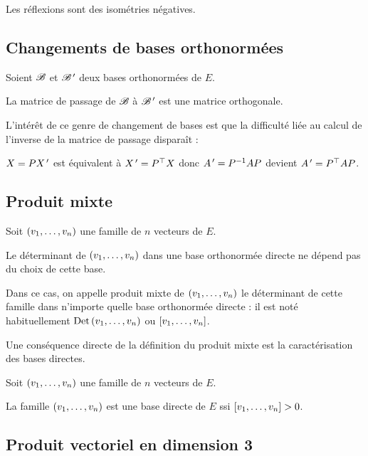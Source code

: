 Les réflexions sont des isométries négatives.

\subsection{Changements de bases orthonormées}

\begin{prop}
Soient \(\mathscr{B}\) et \(\mathscr{B}^{\,\prime}\) deux bases orthonormées de \(E\).

La matrice de passage de \(\mathscr{B}\) à \(\mathscr{B}^{\,\prime}\) est une matrice orthogonale.
\end{prop}

L'intérêt de ce genre de changement de bases est que la difficulté liée au calcul de l'inverse de la matrice de passage disparaît :

\(X=PX^{\,\prime}\) est équivalent à \(X^{\,\prime}=P^{\top}X\) donc \(A^{\,\prime}=P^{-1} AP\) devient \(A^{\,\prime}=P^{\top}AP\).

\subsection{Produit mixte}

\begin{prop}
Soit \(\left(v_1,\dots,v_n\right)\) une famille de \(n\) vecteurs de \(E\).

Le déterminant de \(\left(v_1,\dots,v_n\right)\) dans une base orthonormée directe ne dépend pas du choix de cette base.
\end{prop}

Dans ce cas, on appelle produit mixte de \(\left(v_1,\dots,v_n\right)\) le déterminant de cette famille dans n'importe quelle base orthonormée directe : il est noté habituellement \(\operatorname{Det}\left(v_1,\dots,v_n\right)\) ou \(\left[v_1,\dots,v_n\right]\).

Une conséquence directe de la définition du produit mixte est la caractérisation des bases directes.

\begin{prop}
Soit \(\left(v_1,\dots,v_n\right)\) une famille de \(n\) vecteurs de \(E\).

La famille \(\left(v_1,\dots,v_n\right)\) est une base directe de \(E\) ssi \(\left[v_1,\dots,v_n\right]>0\).
\end{prop}

\subsection{Produit vectoriel en dimension 3}

